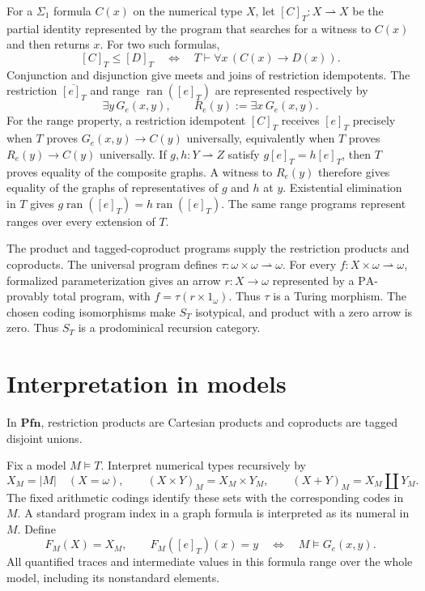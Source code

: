 \documentclass[11pt]{article}
\newcommand{\PA}{\mathrm{PA}}
\newcommand{\Pfn}{\mathbf{Pfn}}
\newcommand{\ran}{\operatorname{ran}}
\begin{document}
For a $\Sigma_1$ formula $C(x)$ on the numerical type $X$, let
$[C]_T:X\rightharpoonup X$ be the partial identity represented by
the program that searches for a witness to $C(x)$ and then returns $x$.
For two such formulas,
\begin{equation}\label{eq:domain-order}
 [C]_T\le[D]_T
 \quad\Longleftrightarrow\quad
 T\vdash\forall x\,(C(x)\longrightarrow D(x)).
\end{equation}
Conjunction and disjunction give meets and joins of restriction
idempotents. The restriction $\overline{[e]_T}$ and range $\ran([e]_T)$
are represented respectively by
\[
 \exists y\,G_e(x,y),\qquad
 R_e(y):=\exists x\,G_e(x,y).
\]
For the range property, a restriction idempotent $[C]_T$ receives
$[e]_T$ precisely when
$T$ proves $G_e(x,y)\to C(y)$ universally, equivalently when
$T$ proves $R_e(y)\to C(y)$ universally.
If $g,h:Y\rightharpoonup Z$ satisfy $g[e]_T=h[e]_T$, then $T$
proves equality of the composite graphs. A witness to $R_e(y)$
therefore gives equality of the graphs of representatives of $g$ and $h$
at $y$. Existential elimination in $T$ gives
$g\ran([e]_T)=h\ran([e]_T)$.
The same range programs represent ranges over every extension of $T$.

The product and tagged-coproduct programs supply the restriction
products and coproducts. The universal program defines
$\tau:\omega\times\omega\rightharpoonup\omega$.
For every $f:X\times\omega\rightharpoonup\omega$, formalized
parameterization gives an arrow $r:X\to\omega$ represented by a
$\PA$-provably total program, with $f=\tau(r\times1_\omega)$.
Thus $\tau$ is a Turing morphism. The chosen coding
isomorphisms make $S_T$ isotypical, and product with a zero arrow is zero.
Thus $S_T$ is a prodominical recursion category.

\section{Interpretation in models}\label{sec:models}

In $\Pfn$, restriction products are Cartesian products and coproducts
are tagged disjoint unions.

Fix a model $M\models T$. Interpret numerical types recursively by
\[
 X_M=|M|\quad(X=\omega),\qquad
 (X\times Y)_M=X_M\times Y_M,\qquad
 (X+Y)_M=X_M\amalg Y_M.
\]
The fixed arithmetic codings identify these sets with the corresponding
codes in $M$. A standard program index in a graph formula is interpreted
as its numeral in $M$. Define
\begin{equation}\label{eq:model-functor}
 F_M(X)=X_M,\qquad
 F_M([e]_T)(x)=y
 \quad\Longleftrightarrow\quad M\models G_e(x,y).
\end{equation}
All quantified traces and intermediate values in this formula range over
the whole model, including its nonstandard elements.
\end{document}
